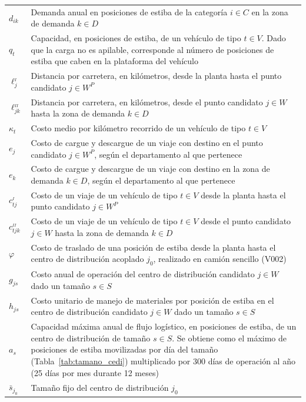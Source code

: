 \documentclass[fleqn, 11pt,letterpaper]{article}
\begin{document}
\begin{tabularx}{\textwidth}{lX}
    $d_{ik}$
    & Demanda anual en posiciones de estiba de la categoría $i \in C$ en la zona de demanda $k \in D$ \\[6mm]
    $q_t$
    & Capacidad, en posiciones de estiba, de un vehículo de tipo $t \in V$. Dado que la carga no es apilable, corresponde al número de posiciones de estiba que caben en la plataforma del vehículo \\[6mm]
    $\ell^{_I}_{j}$
    & Distancia por carretera, en kilómetros, desde la planta hasta el punto candidato $j \in W^{P}$ \\[6mm]
    $\ell^{_{II}}_{jk}$
    & Distancia por carretera, en kilómetros, desde el punto candidato $j \in W$ hasta la zona de demanda $k \in D$ \\[6mm]
    $\kappa_t$
    & Costo medio por kilómetro recorrido de un vehículo de tipo $t \in V$ \\[6mm]
    $e_j$
    & Costo de cargue y descargue de un viaje con destino en el punto candidato $j \in W^{P}$, según el departamento al que pertenece \\[6mm]
    $e_k$
    & Costo de cargue y descargue de un viaje con destino en la zona de demanda $k \in D$, según el departamento al que pertenece \\[6mm]
    $c^{_I}_{tj}$
    & Costo de un viaje de un vehículo de tipo $t \in V$ desde la planta hasta el punto candidato $j \in W^{P}$ \\[6mm]
    $c^{_{II}}_{tjk}$
    & Costo de un viaje de un vehículo de tipo $t \in V$ desde el punto candidato $j \in W$ hasta la zona de demanda $k \in D$ \\[6mm]
    $\varphi$
    & Costo de traslado de una posición de estiba desde la planta hasta el centro de distribución acoplado $j_0$, realizado en camión sencillo (V002) \\[6mm]
    $g_{js}$
    & Costo anual de operación del centro de distribución candidato $j \in W$ dado un tamaño $s \in S$ \\[6mm]
    $h_{js}$
    & Costo unitario de manejo de materiales por posición de estiba en el centro de distribución candidato $j \in W$ dado un tamaño $s \in S$ \\[6mm]
    $a_s$
    & Capacidad máxima anual de flujo logístico, en posiciones de estiba, de un centro de distribución de tamaño $s \in S$. Se obtiene como el máximo de posiciones de estiba movilizadas por día del tamaño (Tabla~\ref{tab:tamano_cedi}) multiplicado por 300 días de operación al año (25 días por mes durante 12 meses) \\[6mm]
    $\bar{s}_{j_0}$
    & Tamaño fijo del centro de distribución $j_0$
\end{tabularx}
\end{document}
